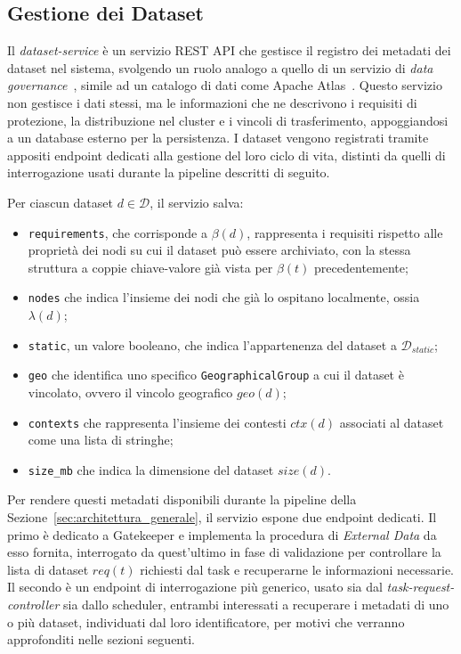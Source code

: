 \subsection{Gestione dei Dataset}
\label{subsec:dataset_service}

Il \emph{dataset-service} è un servizio REST API che gestisce il registro dei metadati dei dataset nel sistema, svolgendo un ruolo analogo a quello di un servizio di \emph{data governance}~\cite{data-governance-framework}, simile ad un catalogo di dati come Apache Atlas~\cite{datahub-apache-atlas-comparison}. Questo servizio non gestisce i dati stessi, ma le informazioni che ne descrivono i requisiti di protezione, la distribuzione nel cluster e i vincoli di trasferimento, appoggiandosi a un database esterno per la persistenza. I dataset vengono registrati tramite appositi endpoint dedicati alla gestione del loro ciclo di vita, distinti da quelli di interrogazione usati durante la pipeline descritti di seguito.

Per ciascun dataset $d \in \mathcal{D}$, il servizio salva:

\begin{itemize}
    \item \texttt{requirements}, che corrisponde a $\beta(d)$, rappresenta i requisiti rispetto alle proprietà dei nodi su cui il dataset può essere archiviato, con la stessa struttura a coppie chiave-valore già vista per $\beta(t)$ precedentemente;
    \item \texttt{nodes} che indica l'insieme dei nodi che già lo ospitano localmente, ossia $\lambda(d)$;
    \item \texttt{static}, un valore booleano, che indica l'appartenenza del dataset a $\mathcal{D}_{static}$;
    \item \texttt{geo} che identifica uno specifico \texttt{GeographicalGroup} a cui il dataset è vincolato, ovvero il vincolo geografico $geo(d)$;
    \item \texttt{contexts} che rappresenta l'insieme dei contesti $ctx(d)$ associati al dataset come una lista di stringhe;
    \item \texttt{size\_mb} che indica la dimensione del dataset $size(d)$.
\end{itemize}

Per rendere questi metadati disponibili durante la pipeline della Sezione~\ref{sec:architettura_generale}, il servizio espone due endpoint dedicati. Il primo è dedicato a Gatekeeper e implementa la procedura di \emph{External Data} da esso fornita, interrogato da quest'ultimo in fase di validazione per controllare la lista di dataset $req(t)$ richiesti dal task e recuperarne le informazioni necessarie. Il secondo è un endpoint di interrogazione più generico, usato sia dal \emph{task-request-controller} sia dallo scheduler, entrambi interessati a recuperare i metadati di uno o più dataset, individuati dal loro identificatore, per motivi che verranno approfonditi nelle sezioni seguenti.

